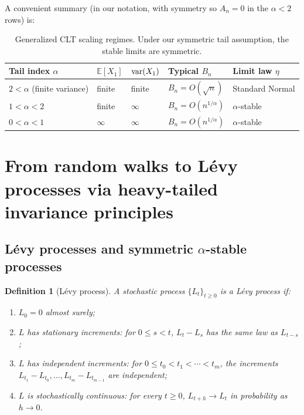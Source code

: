 \documentclass[11pt]{article}
\newtheorem{definition}{Definition}
\begin{document}
A convenient summary (in our notation, with symmetry so $A_n=0$ in the $\alpha<2$ rows) is:

\begin{table}[h]
\centering
\begin{tabular}{lllll}
\hline
Tail index $\alpha$ & ${\mathbb E}[X_1]$ & ${\rm var}(X_1)$ & Typical $B_n$ & Limit law $\eta$ \\
\hline
$2<\alpha$ (finite variance) & finite & finite & $B_n=O(\sqrt{n})$ & Standard Normal \\
$1<\alpha<2$ & finite & $\infty$ & $B_n=O(n^{1/\alpha})$ & $\alpha$-stable \\
$0<\alpha<1$ & $\infty$ & $\infty$ & $B_n=O(n^{1/\alpha})$ & $\alpha$-stable \\
\hline
\end{tabular}
\caption{Generalized CLT scaling regimes. Under our symmetric tail assumption, the stable limits are symmetric.}
\label{tab:gclt}
\end{table}


\section{From random walks to L\'evy processes via heavy-tailed invariance principles}\label{sec:rw_to_levy}

\subsection{L\'evy processes and symmetric $\alpha$-stable processes}\label{subsec:levy_def_stable}

\begin{definition}[L\'evy process]\label{def:levy_process}
A stochastic process $\{L_t\}_{t\ge 0}$ is a \emph{L\'evy process} if:
\begin{enumerate}[label=(\roman*)]
\item $L_0=0$ almost surely;
\item $L$ has \emph{stationary increments}: for $0\le s<t$, $L_t-L_s$ has the same law as $L_{t-s}$;
\item $L$ has \emph{independent increments}: for $0\le t_0<t_1<\cdots<t_m$, the increments $L_{t_1}-L_{t_0},\dots,L_{t_m}-L_{t_{m-1}}$ are independent;
\item $L$ is \emph{stochastically continuous}: for every $t\ge 0$, $L_{t+h}\to L_t$ in probability as $h\to 0$.
\end{enumerate}
\end{definition}
\end{document}
